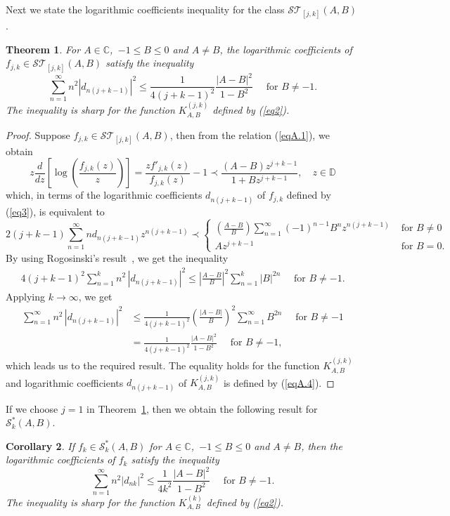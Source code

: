 \documentclass[12pt]{amsart}
\numberwithin{equation}{section}
\newtheorem{thm}{Theorem}[section]
\newtheorem{cor}[thm]{Corollary}
\theoremstyle{definition}
\numberwithin{equation}{section}
\newcommand{\bthm}{\begin{thm}}
\newcommand{\ethm}{\end{thm}}
\newcommand{\bcor}{\begin{cor}}
\newcommand{\ecor}{\end{cor}}
\newcommand{\beq}{\begin{eqnarray}}
\newcommand{\eeq}{\end{eqnarray}}
\newcommand{\bpf}{\begin{proof}}
\newcommand{\epf}{\end{proof}}
\newcommand{\T}{{\mathcal T}}
\newcommand{\es}{{\mathcal S}}
\newcommand{\IC}{{\mathbb C}}
\newcommand{\D}{{\mathbb D}}
\begin{document}
Next we state the logarithmic coefficients inequality for the class $\es \T_{[j,k]}(A,B)$.
\bthm\label{thm2}
For $A\in\IC $,\,  $-1\le B\le 0$ and $A\neq B$, the logarithmic coefficients of $f_{j,k} \in \es \T_{[j,k]}(A,B)$ satisfy the inequality
$$ \sum_{n=1}^{\infty} n^2|d_{n(j+k-1)}|^{2} \leq \frac{1}{4(j+k-1)^2} \frac{|A-B|^2}{1-B^2} \quad \mbox{ for } B\neq -1.
$$
The inequality is sharp for the function $K^{(j,k)}_{A,B}$ defined by (\ref{eq2}).
\ethm

\bpf
Suppose $f_{j,k} \in \es \T_{[j,k]}(A,B)$, then from the relation (\ref{eqA.1}), we obtain
$$ z \frac{d}{dz}\left[ \log \left( \frac{f_{j,k}(z)}{z} \right)\right]=
\frac{zf'_{j,k}(z)}{f_{j,k}(z)} - 1 \prec \frac{(A-B)z^{j+k-1}}{1+B z^{j+k-1}}, \quad   z\in \D
$$
which, in terms of the logarithmic coefficients $ d_{n(j+k-1)}$ of $f_{j,k}$ defined by (\ref{eq3}), is equivalent to
$$ 2(j+k-1)\sum_{n=1}^{\infty}n d_{n(j+k-1)}z^{n(j+k-1)} \prec
\left \{
\begin{array}{ll}
\displaystyle
\left(\frac{A-B}{B}\right)\sum_{n=1}^{\infty} (-1)^{n-1} B^n z^{n(j+k-1)} & \mbox{ for } B\neq 0\\[6mm]
Az^{j+k-1} & \mbox{ for } B= 0.
\end{array}\right.
$$
By using Rogosinski’s result~\cite[Theorem~II (i)]{Rog43}, we get the inequality
\beq\label{eq5} 
4(j+k-1)^2 \sum_{n=1}^{k} n^2 \, |d_{n(j+k-1)}|^2  \le \left|\frac{A-B}{B}\right|^2\sum_{n=1}^{k} |B|^{2n}  \quad \mbox{ for }B\neq -1.
 \eeq 
Applying $k \rightarrow \infty$, we get
\begin{align*} 
\sum_{n=1}^{\infty} n^2 \, |d_{n(j+k-1)}|^2 & \le \frac{1}{4(j+k-1)^2}\left(\frac{|A-B|}{B}\right)^2\sum_{n=1}^{\infty}B^{2n} \quad \mbox{ for } B\neq -1\\
& = \frac{1}{4(j+k-1)^2} \frac{|A-B|^2}{1-B^2}  \quad \mbox{ for }B\neq -1,
\end{align*}
which leads us to the required result.
The equality holds for the function $K^{(j,k)}_{A,B}$ and logarithmic coefficients $ d_{n(j+k-1)}$ of $K^{(j,k)}_{A,B}$ is defined by (\ref{eqA.4}).
\epf

If we choose $j=1$ in Theorem~\ref{thm2}, then we obtain the following result for $\es^*_k(A,B)$.
\bcor
If  $f_{k} \in \es^*_k(A,B)$ for $A\in\IC $,\,  $-1\le B\le 0$ and $A\neq B$, then the logarithmic coefficients of $f_{k} $ satisfy the inequality
$$ \sum_{n=1}^{\infty} n^2|d_{nk}|^{2} \leq \frac{1}{4k^2} \frac{|A-B|^2}{1-B^2} \quad \mbox{ for } B\neq -1.
$$
The inequality is sharp for the function $K^{(k)}_{A,B}$ defined by (\ref{eq2}).
\ecor
\end{document}
